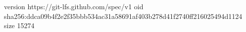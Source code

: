 version https://git-lfs.github.com/spec/v1
oid sha256:ddca09b4f2e2f35bbb534ac31a58691af403b278d41f2740ff216025494d1124
size 15274
